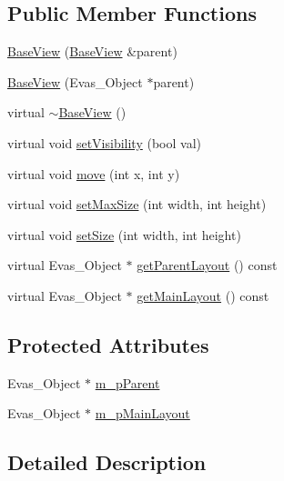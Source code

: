 \subsection*{Public Member Functions}
\begin{DoxyCompactItemize}
\item 
\hyperlink{class_base_view_a0ea730b39012b33298fd37fa1d2c28b4}{Base\-View} (\hyperlink{class_base_view}{Base\-View} \&parent)
\item 
\hyperlink{class_base_view_ad88b86000a86a321ec237fc11eb21f00}{Base\-View} (Evas\-\_\-\-Object $\ast$parent)
\item 
virtual \hyperlink{class_base_view_a0b87986502d132344f08be851cdb15d2}{$\sim$\-Base\-View} ()
\item 
virtual void \hyperlink{class_base_view_a3fb4396cd7133b73f113251c3828538a}{set\-Visibility} (bool val)
\item 
virtual void \hyperlink{class_base_view_afa1b6656ef2b8eff83dd476e8b1e1200}{move} (int x, int y)
\item 
virtual void \hyperlink{class_base_view_a4737f13d8c9c17ecd2748e46e9f075b0}{set\-Max\-Size} (int width, int height)
\item 
virtual void \hyperlink{class_base_view_a41a081c844838223e991bfe2d1220090}{set\-Size} (int width, int height)
\item 
virtual Evas\-\_\-\-Object $\ast$ \hyperlink{class_base_view_a11e9825ed7ba6af5ad721acdbbe2762b}{get\-Parent\-Layout} () const 
\item 
virtual Evas\-\_\-\-Object $\ast$ \hyperlink{class_base_view_a4a09f445d9eb27d674382189f4ae7e14}{get\-Main\-Layout} () const 
\end{DoxyCompactItemize}
\subsection*{Protected Attributes}
\begin{DoxyCompactItemize}
\item 
Evas\-\_\-\-Object $\ast$ \hyperlink{class_base_view_af2e9d5f37dc60430d28cebcb55ffe2b4}{m\-\_\-p\-Parent}
\item 
Evas\-\_\-\-Object $\ast$ \hyperlink{class_base_view_a27bf1606488064c17a4fad81b0feb61f}{m\-\_\-p\-Main\-Layout}
\end{DoxyCompactItemize}


\subsection{Detailed Description}


